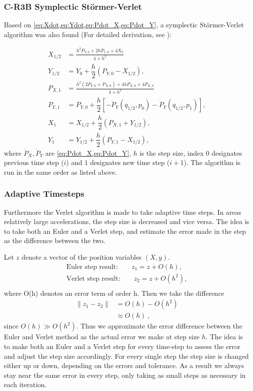 \subsubsection{C-R3B Symplectic Störmer-Verlet}
Based on \cref{eq:Xdot,eq:Ydot,eq:Pdot_X,eq:Pdot_Y}, a symplectic Störmer-Verlet algorithm was also found (For detailed derivation, see \cite{Saxe2015}):

\begin{align}
    X_{1/2} &= \frac{h^2 P_{Y,0} + 2 h \dot{P}_{x,0} + 4 X_0}{4 + h^2} \label{eq:verlet-x_1/2} \\
    Y_{1/2} &= Y_0 + \dfrac{h}{2} (P_{Y,0} - X_{1/2}), \label{eq:verlet-y_1/2} \\
    P_{X,1} &= \frac{h^2 (2 \dot{P}_{Y,0} + P_{X,0}) + 4 h \dot{P}_{X,0} + 4 P_{X,0} }{4 + h^2} \label{eq:verlet-px_1} \\
    P_{Y,1} &= P_{Y,0} + \dfrac{h}{2} \left[-\dot{P}_Y(q_{1/2},p_0) -\dot{P}_Y(q_{1/2},p_1) \right], \label{eq:verlet-py_1} \\
    X_1 &= X_{1/2} + \dfrac{h}{2} (P_{X,1} + Y_{1/2}), \label{eq:verlet-x_1} \\
    Y_1 &= Y_{1/2} + \dfrac{h}{2} (P_{Y,1} - X_{1/2}), \label{eq:verlet-y_1}
\end{align}
where \(\dot{P}_X,\dot{P}_Y\) are \cref{eq:Pdot_X,eq:Pdot_Y}, \(h\) is the step size, index \(0\) designates previous time step ($i$) and \(1\) designates new time step ($i+1$). The algorithm is run in the same order as listed above.

\subsubsection{Adaptive Timesteps}
Furthermore the Verlet algorithm is made to take adaptive time steps. In areas relatively large accelerations, the step size is decreased and vice versa. The idea is to take both an Euler and a Verlet step, and estimate the error made in the step as the difference between the two.

Let $z$ denote a vector of the position variables $(X,y)$.
\begin{align}
\text{Euler step result:} \qquad z_1 = z + O(h), \\
\text{Verlet step result:} \qquad z_2 = z + O(h^2), \\
\end{align}
where O(h) denotes an error term of order h. Then we take the difference
\begin{align}
\|z_1 - z_2\| &= O(h) - O(h^2) \\
&\approx O(h)\ ,
\end{align}
since $O(h) \gg O(h^2)$. Thus we approximate the error difference between the Euler and Verlet method as the actual error we make at step size $h$. The idea is to make both an Euler and a Verlet step for every time-step to assess the error and adjust the step size accordingly. For every single step the step size is changed either up or down, depending on the errors and tolerance. As a result we always stay near the same error in every step, only taking as small steps as necessary in each iteration.

